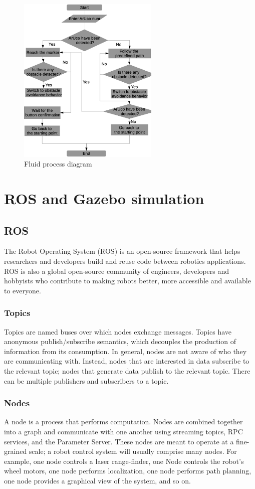 \begin{figure}[h!]
    \centering
 	\includegraphics[trim=0 0 0 0,clip,width=0.6\textwidth]{Figs/Flowchart.eps}
    \caption{Fluid process diagram}
    \label{fig:Chessboard}
\end{figure}

\section{ROS and Gazebo simulation}
\subsection{ROS}
The Robot Operating System (ROS) is an open-source framework that helps researchers and developers build and reuse code between robotics applications. ROS is also a global open-source community of engineers, developers and hobbyists who contribute to making robots better, more accessible and available to everyone.
\subsubsection{Topics}
Topics are named buses over which nodes exchange messages. Topics have anonymous publish/subscribe semantics, which decouples the production of information from its consumption. In general, nodes are not aware of who they are communicating with. Instead, nodes that are interested in data subscribe to the relevant topic; nodes that generate data publish to the relevant topic. There can be multiple publishers and subscribers to a topic.
\subsubsection{Nodes}
A node is a process that performs computation. Nodes are combined together into a graph and communicate with one another using streaming topics, RPC services, and the Parameter Server. These nodes are meant to operate at a fine-grained scale; a robot control system will usually comprise many nodes. For example, one node controls a laser range-finder, one Node controls the robot's wheel motors, one node performs localization, one node performs path planning, one node provides a graphical view of the system, and so on.
